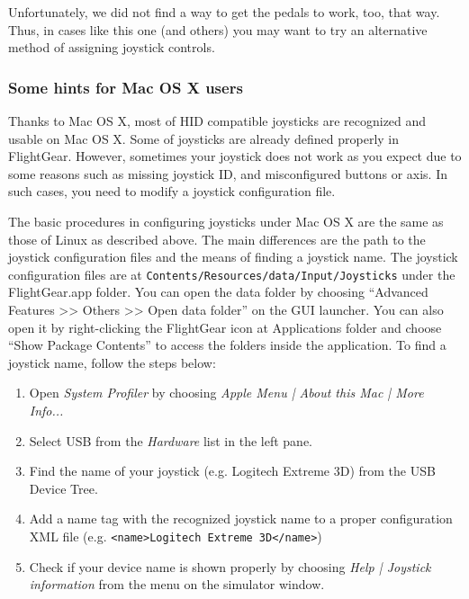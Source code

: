 Unfortunately, we did not find a way to get the pedals to work, too, that way. Thus, in cases like this one (and others) you may want to try an alternative method of assigning joystick controls.

\subsubsection{Some hints for Mac OS X users\label{joymac}}
Thanks to Mac OS X, most of HID compatible joysticks are recognized and usable on Mac OS X. Some of joysticks are already defined properly in FlightGear. However, sometimes your joystick does not work as you expect due to some reasons such as missing joystick ID, and misconfigured buttons or axis. In such cases, you need to modify a joystick configuration file.

The basic procedures in configuring joysticks under Mac OS X are the same as those of Linux as described above. The main differences are the path to the joystick configuration files and the means of finding a joystick name. The joystick configuration files are at \texttt{Contents/Resources/data/Input/Joysticks} under the FlightGear.app folder. You can open the data folder by choosing ``Advanced Features >> Others >> Open data folder'' on the GUI launcher. You can also open it by right-clicking the FlightGear icon at Applications folder and choose ``Show Package Contents'' to access the folders inside the application. To find a joystick name, follow the steps below:

\begin{enumerate}
\item Open \textit{System Profiler} by choosing \textit{Apple Menu | About this Mac | More Info...}
\item Select USB from the \textit{Hardware} list in the left pane.
\item Find the name of your joystick (e.g. Logitech Extreme 3D) from the USB Device Tree.
\item Add a name tag with the recognized joystick name to a proper configuration XML file (e.g. \verb=<name>Logitech Extreme 3D</name>=)
\item Check if your device name is shown properly by choosing \textit{Help | Joystick information} from the menu on the \FlightGear{} simulator window.
\end{enumerate}

